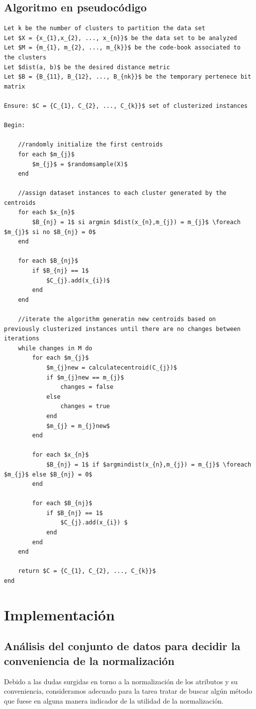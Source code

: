 \documentclass[10pt,a4paper]{article}
\begin{document}

\subsection{Algoritmo en pseudocódigo}

\begin{lstlisting}[mathescape=true]
Let k be the number of clusters to partition the data set
Let $X = {x_{1},x_{2}, ..., x_{n}}$ be the data set to be analyzed
Let $M = {m_{1}, m_{2}, ..., m_{k}}$ be the code-book associated to the clusters
Let $dist(a, b)$ be the desired distance metric
Let $B = {B_{11}, B_{12}, ..., B_{nk}}$ be the temporary pertenece bit matrix

Ensure: $C = {C_{1}, C_{2}, ..., C_{k}}$ set of clusterized instances

Begin:

	//randomly initialize the first centroids
	for each $m_{j}$
		$m_{j}$ = $randomsample(X)$
	end
	
	//assign dataset instances to each cluster generated by the centroids
	for each $x_{n}$
		$B_{nj} = 1$ si argmin $dist(x_{n},m_{j}) = m_{j}$ \foreach $m_{j}$ si no $B_{nj} = 0$ 
	end
		
	for each $B_{nj}$
		if $B_{nj} == 1$
			$C_{j}.add(x_{i})$ 
		end
	end
	
	//iterate the algorithm generatin new centroids based on previously clusterized instances until there are no changes between iterations
	while changes in M do
		for each $m_{j}$
			$m_{j}new = calculatecentroid(C_{j})$
			if $m_{j}new == m_{j}$
				changes = false
			else
				changes = true
			end
			$m_{j} = m_{j}new$	
		end
		
		for each $x_{n}$
			$B_{nj} = 1$ if $argmindist(x_{n},m_{j}) = m_{j}$ \foreach $m_{j}$ else $B_{nj} = 0$
		end
		
		for each $B_{nj}$
			if $B_{nj} == 1$
				$C_{j}.add(x_{i}) $
			end
		end
	end
	
	return $C = {C_{1}, C_{2}, ..., C_{k}}$
end

\end{lstlisting}

\section{Implementación}

\subsection{Análisis del conjunto de datos para decidir la conveniencia de la normalización}
Debido a las dudas surgidas en torno a la normalización de los atributos y su conveniencia, consideramos adecuado para la tarea tratar de buscar algún método que fuese
en alguna manera indicador de la utilidad de la normalización.
\end{document}

